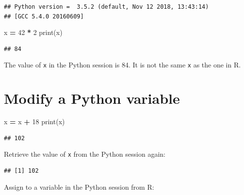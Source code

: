 \documentclass[]{book}
\newenvironment{Shaded}{\begin{snugshade}}{\end{snugshade}}
\newcommand{\BuiltInTok}[1]{#1}
\newcommand{\DecValTok}[1]{\textcolor[rgb]{0.00,0.00,0.81}{#1}}
\newcommand{\NormalTok}[1]{#1}
\newcommand{\OperatorTok}[1]{\textcolor[rgb]{0.81,0.36,0.00}{\textbf{#1}}}
\newcommand{\StringTok}[1]{\textcolor[rgb]{0.31,0.60,0.02}{#1}}
\begin{document}
\begin{verbatim}
## Python version =  3.5.2 (default, Nov 12 2018, 13:43:14) 
## [GCC 5.4.0 20160609]
\end{verbatim}

\begin{Shaded}
\begin{Highlighting}[]
\NormalTok{x }\OperatorTok{=} \DecValTok{42} \OperatorTok{*} \DecValTok{2}
\BuiltInTok{print}\NormalTok{(x) }
\end{Highlighting}
\end{Shaded}

\begin{verbatim}
## 84
\end{verbatim}

The value of \texttt{x} in the Python session is 84.
It is not the same \texttt{x} as the one in R.

\hypertarget{modify-a-python-variable}{%
\section{Modify a Python variable}\label{modify-a-python-variable}}

\begin{Shaded}
\begin{Highlighting}[]
\NormalTok{x }\OperatorTok{=}\NormalTok{ x }\OperatorTok{+} \DecValTok{18} 
\BuiltInTok{print}\NormalTok{(x)}
\end{Highlighting}
\end{Shaded}

\begin{verbatim}
## 102
\end{verbatim}

Retrieve the value of \texttt{x} from the Python session again:

\begin{Shaded}
\end{Shaded}

\begin{verbatim}
## [1] 102
\end{verbatim}

Assign to a variable in the Python session from R:

\begin{Shaded}
\end{Shaded}
\end{document}
